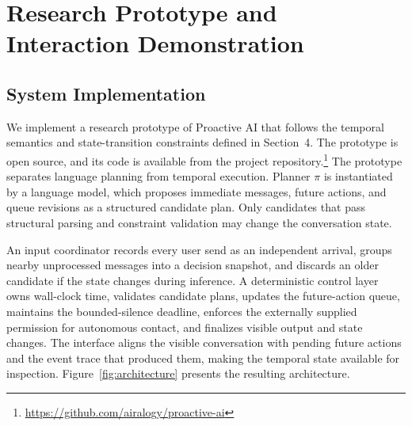 \documentclass[manuscript,nonacm]{acmart}
\begin{document}
\section{Research Prototype and Interaction Demonstration}

\subsection{System Implementation}

We implement a research prototype of Proactive AI that follows the temporal
semantics and state-transition constraints defined in Section~4. The prototype is open source,
and its code is available from the project repository.\footnote{%
\url{https://github.com/airalogy/proactive-ai}} The prototype separates
language planning from temporal execution. Planner $\pi$ is instantiated by a
language model, which proposes immediate messages, future actions, and queue
revisions as a structured candidate plan. Only candidates that pass structural
parsing and constraint validation may change the conversation state.

An input coordinator records every user send as an independent arrival, groups
nearby unprocessed messages into a decision snapshot, and discards an older
candidate if the state changes during inference. A deterministic control layer
owns wall-clock time, validates candidate plans, updates the future-action queue,
maintains the bounded-silence deadline, enforces the externally supplied
permission for autonomous contact, and finalizes visible output and state
changes. The interface aligns the visible
conversation with pending future actions and the event trace that produced them,
making the temporal state available for inspection.
Figure~\ref{fig:architecture} presents the resulting architecture.
\end{document}
